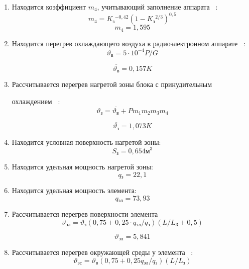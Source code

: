 \begin{enumerate}[label={\arabic*.}]
\item Находится коэффициент $m_4$,
   учитывающий заполнение аппарата ~\cite{Rotkop1976}:
   \begin{equation}
     m_4 = K\mathrm{_{з}}^{-0,42}(1-K\mathrm{_{з}}^{2/3})^{0,5}
   \end{equation}
   $$m_4 = 1,595$$
  
\item Находится перегрев охлаждающего воздуха
  в радиоэлектронном аппарате ~\cite{Rotkop1976}:
  \begin{equation}
    \overline{\vartheta\mathrm{_{в}}} = 5 \cdot 10^{-4} P/G
  \end{equation}
  
  $$\overline{\vartheta\mathrm{_{в}}} = 0,157K$$

\item Рассчитывается перегрев нагретой зоны блока с принудительным

  охлаждением ~\cite{Rotkop1976}:
  \begin{equation}
    \vartheta\mathrm{_{з}} = \overline{\vartheta\mathrm{_{в}}} + P m_1 m_2 m_3 m_4
    \end{equation}
  

    $$\overline{\vartheta\mathrm{_{з}}} = 1,073 K$$

\item Находится условная поверхность нагретой зоны:
  $$S\mathrm{_{з}} = 0,654 \mathrm{м^3}$$

\item Находится удельная мощность нагретой зоны:
  $$q\mathrm{_{з}} = 22,1$$

\item Находится удельная мощность элемента:
  $$q\mathrm{_{эл}} = 73,93$$

\item Рассчитывается перегрев поверхности элемента ~\cite{Rotkop1976}
    \begin{equation}
    \vartheta\mathrm{_{эл}}   =  \vartheta\mathrm{_{з}} (0,75 + 0,25 \cdot q\mathrm{_{эл}} / q\mathrm{_{з}})(L /L_{3} + 0,5)
    \end{equation}

    $$\vartheta\mathrm{_{эл}} = 5,841$$

\item Рассчитывается перегрев окружающей
  среды у элемента ~\cite{Rotkop1976}:
  \begin{equation}
    \vartheta\mathrm{_{эс}} = \vartheta\mathrm{_{в}} (0,75 + 0,25 q\mathrm{_{эл}} / q\mathrm{_{з}}) ({L} / {L_{з}})
  \end{equation}
  

\end{enumerate}
